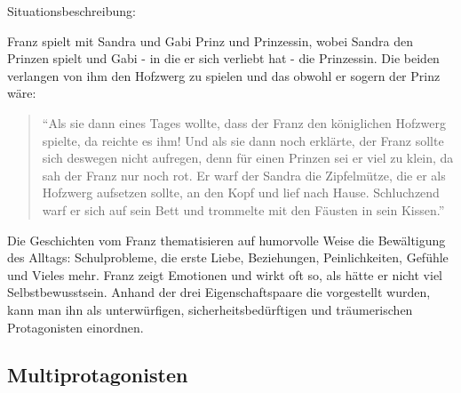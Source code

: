 Situationsbeschreibung:

Franz spielt mit Sandra und Gabi Prinz und Prinzessin, wobei Sandra den
Prinzen spielt und Gabi - in die er sich verliebt hat - die Prinzessin.
Die beiden verlangen von ihm den Hofzwerg zu spielen und das obwohl er
sogern der Prinz wäre:

\begin{quote}
``Als sie dann eines Tages wollte, dass der Franz den königlichen
Hofzwerg spielte, da reichte es ihm! Und als sie dann noch erklärte, der
Franz sollte sich deswegen nicht aufregen, denn für einen Prinzen sei er
viel zu klein, da sah der Franz nur noch rot. Er warf der Sandra die
Zipfelmütze, die er als Hofzwerg aufsetzen sollte, an den Kopf und lief
nach Hause. Schluchzend warf er sich auf sein Bett und trommelte mit den
Fäusten in sein Kissen.'' \parencite[][30]{Noestlinger2010}
\end{quote}

Die Geschichten vom Franz thematisieren auf humorvolle Weise die
Bewältigung des Alltags: Schulprobleme, die erste Liebe, Beziehungen,
Peinlichkeiten, Gefühle und Vieles mehr. Franz zeigt Emotionen und wirkt
oft so, als hätte er nicht viel Selbstbewusstsein. Anhand der drei
Eigenschaftspaare die vorgestellt wurden, kann man ihn als
unterwürfigen, sicherheitsbedürftigen und träumerischen Protagonisten
einordnen.

\subsection{Multiprotagonisten}

